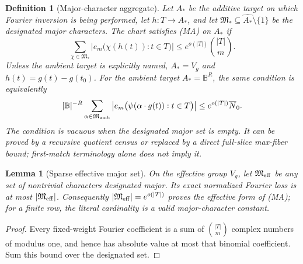 \documentclass[12pt,a4paper]{amsart}
\numberwithin{equation}{section}
\newtheorem{lemma}[lemma]{Lemma}
\newtheorem{definition}[definition]{Definition}
\theoremstyle{remark}
\newcommand{\B}{\mathbb B}
\newcommand{\barN}{\overline N}
\newcommand{\abs}[1]{\lvert #1\rvert}
\begin{document}
\begin{definition}[Major-character aggregate]
\label{def:major-arc-aggregate}
Let \(A_*\) be the additive target on which Fourier inversion is being
performed, let \(h:T\to A_*\), and let
\(\mathfrak M_*\subseteq\widehat{A_*}\setminus\{1\}\) be the designated
major characters.  The chart satisfies \textup{(MA)} on \(A_*\) if
\[
 \tag{MA}\label{eq:major-arc-aggregate}
 \sum_{\chi\in\mathfrak M_*}
 \left|e_m\bigl(\chi(h(t)):t\in T\bigr)\right|
 \le e^{o(\abs T)}\binom{\abs T}m .
\]
Unless the ambient target is explicitly named, \(A_*=V_g\) and
\(h(t)=g(t)-g(t_0)\).  For the ambient target \(A_*=\B^R\), the same
condition is equivalently
\[
 \abs\B^{-R}\sum_{\alpha\in\mathfrak M_{\rm amb}}
 \left|e_m\bigl(\psi(\alpha\cdot g(t)):t\in T\bigr)\right|
 \le e^{o(\abs T)}\barN_0.
\]
The condition is vacuous when the designated major set is empty.  It can
be proved by a recursive quotient census or replaced by a direct
full-slice max-fiber bound; first-match terminology alone does not imply
it.
\end{definition}

\begin{lemma}[Sparse effective major set]
\label{lem:sparse-major-payment}
On the effective group \(V_g\), let \(\mathfrak M_{\rm eff}\) be any set
of nontrivial characters designated major.  Its exact normalized Fourier
loss is at most \(\abs{\mathfrak M_{\rm eff}}\).  Consequently
\(\abs{\mathfrak M_{\rm eff}}=e^{o(\abs T)}\) proves the effective form
of \textup{(MA)}; for a finite row, the literal cardinality is a valid
major-character constant.
\end{lemma}

\begin{proof}
Every fixed-weight Fourier coefficient is a sum of \(\binom{\abs T}m\)
complex numbers of modulus one, and hence has absolute value at most that
binomial coefficient.  Sum this bound over the designated set.
\end{proof}
\end{document}
